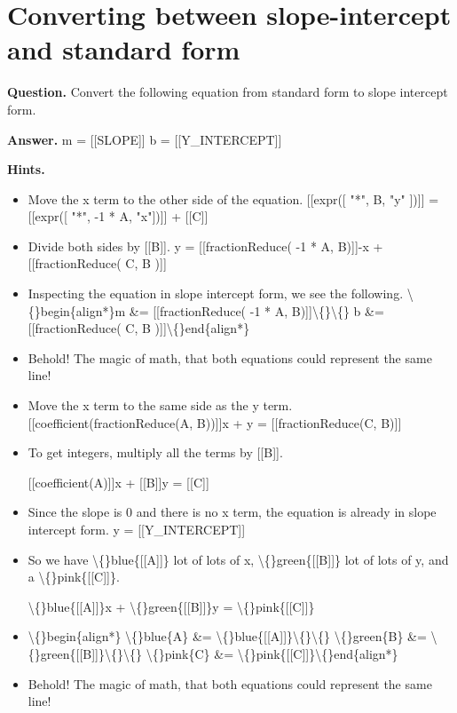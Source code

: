\documentclass{article}
\begin{document}
\section*{Converting between slope-intercept and standard form}
\textbf{Question.} Convert the following equation from standard form to slope intercept form.

\textbf{Answer.} m = [[SLOPE]]
                b = [[Y\_INTERCEPT]]

\textbf{Hints.}
\begin{itemize}
  \item Move the x term to the other side of the equation.
                    [[expr([ "*", B, "y" ])]] = [[expr([ "*", -1 * A, "x"])]] + [[C]]
  \item Divide both sides by [[B]].
                    y = [[fractionReduce( -1 * A, B)]]-x + [[fractionReduce( C, B )]]
  \item Inspecting the equation in slope intercept form, we see the following.
                    \textbackslash\{\}begin\{align*\}m \&= [[fractionReduce( -1 * A, B)]]\textbackslash\{\}\textbackslash\{\}
                        b \&= [[fractionReduce( C, B )]]\textbackslash\{\}end\{align*\}
  \item Behold! The magic of math, that both equations could represent the same line!
  \item Move the x term to the same side as the y term.
                    [[coefficient(fractionReduce(A, B))]]x + y = [[fractionReduce(C, B)]]
  \item To get integers, multiply all the terms by [[B]].
                    
                        [[coefficient(A)]]x + 
                        [[B]]y = [[C]]
  \item Since the slope is 0 and there is no x term, the equation is already in slope intercept form.
                    y = [[Y\_INTERCEPT]]
  \item So we have \textbackslash\{\}blue\{[[A]]\}
                         lot of 
                         lots of 
                        x, \textbackslash\{\}green\{[[B]]\}
                         lot of 
                         lots of 
                        y, and a \textbackslash\{\}pink\{[[C]]\}.
                    
                    \textbackslash\{\}blue\{[[A]]\}x + \textbackslash\{\}green\{[[B]]\}y = \textbackslash\{\}pink\{[[C]]\}
  \item \textbackslash\{\}begin\{align*\}
                    \textbackslash\{\}blue\{A\} \&= \textbackslash\{\}blue\{[[A]]\}\textbackslash\{\}\textbackslash\{\}
                    \textbackslash\{\}green\{B\} \&= \textbackslash\{\}green\{[[B]]\}\textbackslash\{\}\textbackslash\{\}
                    \textbackslash\{\}pink\{C\} \&= \textbackslash\{\}pink\{[[C]]\}\textbackslash\{\}end\{align*\}
  \item Behold! The magic of math, that both equations could represent the same line!
\end{itemize}
\end{document}
